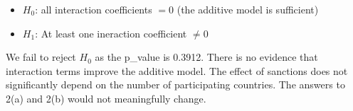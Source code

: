 \documentclass[12pt,letterpaper]{article}
\begin{document}
\begin{enumerate}
	\begin{itemize}
		\item $H_0$: all interaction coefficients $= 0$  (the additive model is sufficient)
		\item $H_1$: At least one ineraction coefficient $ \neq 0$
	\end{itemize}
	
	 
	\vspace{.5cm}
	
	\vspace*{.5cm}
	We fail to reject $H_0$ as the p\_value is 0.3912.  There is no evidence that interaction terms improve the additive model.  The effect of sanctions does not significantly depend on the number of participating countries. The answers to 2(a) and 2(b) would not meaningfully change.
	
	
	
	\end{enumerate}
\end{document}
